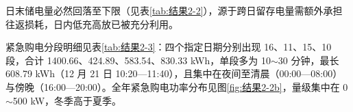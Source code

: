 日末储电量必然回落至下限（见表\ref{tab:结果2-2}），源于跨日留存电量需额外承担往返损耗，日内低充高放已被充分利用。

紧急购电分段明细见表\ref{tab:结果2-3}：四个指定日期分别出现 16、11、15、10 段，合计 1400.66、424.89、583.54、830.33 kWh，单段多为 10$\sim$30 分钟，最长 608.79 kWh（12 月 21 日 10:20—11:40），且集中在夜间至清晨（00:00—08:00）与傍晚（16:00—20:00）。全年紧急购电功率分布见图\ref{fig:结果2-2b}，量级集中在 0$\sim$500 kW，冬季高于夏季。

{\footnotesize\renewcommand{\arraystretch}{0.95}\begin{longtable}{>{\centering\arraybackslash}p{}>{\centering\arraybackslash}p{}>{\centering\arraybackslash}p{}>{\centering\arraybackslash}p{}>{\centering\arraybackslash}p{}>{\centering\arraybackslash}p{}>{\centering\arraybackslash}p{}>{\centering\arraybackslash}p{}}
  

\end{longtable}}
